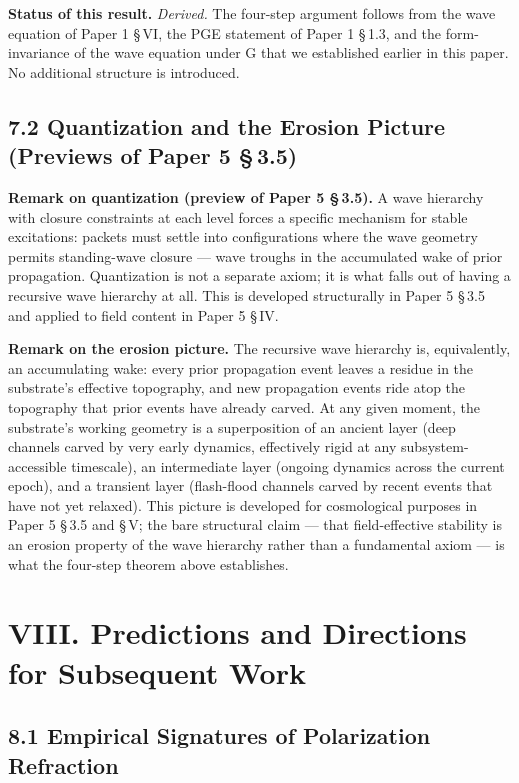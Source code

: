 \documentclass[11pt,oneside]{report}
\theoremstyle{definition}
\theoremstyle{remark}
\begin{document}
\textbf{Status of this result.} \emph{Derived.} The four-step argument
follows from the wave equation of Paper 1 \S\,VI, the PGE statement of
Paper 1 \S\,1.3, and the form-invariance of the wave equation under G that
we established earlier in this paper. No additional structure is
introduced.

\subsection*{7.2 Quantization and the Erosion Picture (Previews of Paper 5 \S\,3.5)}

\textbf{Remark on quantization (preview of Paper 5 \S\,3.5).} A wave
hierarchy with closure constraints at each level forces a specific
mechanism for stable excitations: packets must settle into
configurations where the wave geometry permits standing-wave closure ---
wave troughs in the accumulated wake of prior propagation. Quantization
is not a separate axiom; it is what falls out of having a recursive wave
hierarchy at all. This is developed structurally in Paper 5 \S\,3.5 and
applied to field content in Paper 5 \S\,IV.

\textbf{Remark on the erosion picture.} The recursive wave hierarchy is,
equivalently, an accumulating wake: every prior propagation event leaves
a residue in the substrate's effective topography, and new propagation
events ride atop the topography that prior events have already carved.
At any given moment, the substrate's working geometry is a superposition
of an ancient layer (deep channels carved by very early dynamics,
effectively rigid at any subsystem-accessible timescale), an
intermediate layer (ongoing dynamics across the current epoch), and a
transient layer (flash-flood channels carved by recent events that have
not yet relaxed). This picture is developed for cosmological purposes in
Paper 5 \S\,3.5 and \S\,V; the bare structural claim --- that field-effective
stability is an erosion property of the wave hierarchy rather than a
fundamental axiom --- is what the four-step theorem above establishes.

\section*{VIII. Predictions and Directions for Subsequent Work}

\subsection*{8.1 Empirical Signatures of Polarization Refraction}
\end{document}
